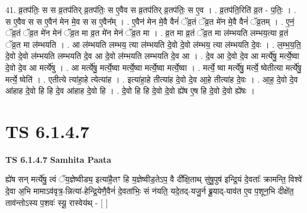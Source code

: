 \documentclass[17pt]{extarticle}
\begin{document}
41. व्र॒तप॑तिः॒ स स व्र॒तप॑तिर् व्र॒तप॑तिः॒ स ए॒वैव स व्र॒तप॑तिर् व्र॒तप॑तिः॒ स ए॒व । . व्र॒तप॑ति॒रिति॑ व्र॒त - प॒तिः॒ । . स ए॒वैव स स ए॒वैन॑ मेन मे॒व स स ए॒वैन᳚म् । . ए॒वैन॑ मेन मे॒वै वैनं॑ ॅव्र॒तं ॅव्र॒त मे॑न मे॒वै वैनं॑ ॅव्र॒तम् । . ए॒नं॒ ॅव्र॒तं ॅव्र॒त मे॑न मेनं ॅव्र॒त मा व्र॒त मे॑न मेनं ॅव्र॒त मा । . व्र॒त मा व्र॒तं ॅव्र॒त मा ल॑म्भयति लम्भय॒त्या व्र॒तं ॅव्र॒त मा ल॑म्भयति । . आ ल॑म्भयति लम्भय॒ त्या ल॑म्भयति दे॒वो दे॒वो ल॑म्भय॒ त्या ल॑म्भयति दे॒वः । . ल॒म्भ॒य॒ति॒ दे॒वो दे॒वो ल॑म्भयति लम्भयति दे॒व आ दे॒वो ल॑म्भयति लम्भयति दे॒व आ । . दे॒व आ दे॒वो दे॒व आ मर्त्ये॑षु॒ मर्त्ये॒ष्वा दे॒वो दे॒व आ मर्त्ये॑षु । . आ मर्त्ये॑षु॒ मर्त्ये॒ष्वा मर्त्ये॒ष्वा मर्त्ये॒ष्वा मर्त्ये॒ष्वा । . मर्त्ये॒ ष्वा मर्त्ये॑षु॒ मर्त्ये॒ ष्वेतीत्या मर्त्ये॑षु॒ मर्त्ये॒ ष्वेति॑ । . एतीत्ये त्या॑हा॒हे त्येत्या॑ह । . इत्या॑हा॒हे तीत्या॑ह दे॒वो दे॒व आ॒हे तीत्या॑ह दे॒वः । . आ॒ह॒ दे॒वो दे॒व आ॑हाह दे॒वो हि हि दे॒व आ॑हाह दे॒वो हि । . दे॒वो हि हि दे॒वो दे॒वो ह्ये॑ष ए॒ष हि दे॒वो दे॒वो ह्ये॑षः । \newline
\pagebreak
{}

\section{ TS 6.1.4.7 }

\textbf{TS 6.1.4.7 } \newline
\textbf{Samhita Paata} \newline

ह्ये॑ष सन् मर्त्ये॑षु॒ त्वं ॅय॒ज्ञेष्वीड्य॒ इत्या॑है॒तꣳ हि य॒ज्ञेष्वीड॒तेऽप॒ वै दी᳚क्षि॒ताथ् सु॑षु॒पुष॑ इन्द्रि॒यं दे॒वताः᳚ क्रामन्ति॒ विश्वे॑ दे॒वा अ॒भि मामाऽव॑वृत्र॒-न्नित्या॑-हेन्द्रि॒येणै॒वैनं॑ दे॒वता॑भिः॒ सं न॑यति॒ यदे॒तद्-यजु॒र्न ब्रू॒याद्-याव॑त ए॒व प॒शून॒भि दीक्षे॑त॒ ताव॑न्तोऽस्य प॒शवः॑ स्यू॒ रास्वेय॑थ् - [  ] \newline
\end{document}
